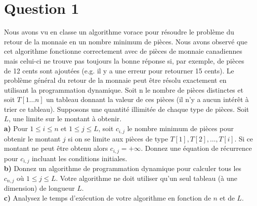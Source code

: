 \documentclass[devoir3.tex]{subfiles}
\begin{document}
\section*{Question 1}
Nous avons vu en classe un algorithme vorace pour résoudre le problème du retour de la monnaie en un nombre minimum de pièces. Nous avons observé que cet algorithme fonctionne correctement avec de pièces de monnaie canadiennes mais celui-ci ne trouve pas toujours la bonne réponse si, par exemple, de pièces de 12 cents sont ajoutées (e.g. il y a une erreur pour retourner 15 cents). Le problème général du retour de la monnaie peut être résolu exactement en utilisant la programmation dynamique.
Soit n le nombre de pièces distinctes et soit \(T[1 \dots n]\) un tableau donnant la valeur de ces pièces (il n’y a aucun intérêt à trier ce tableau). Supposons une quantité illimitée de chaque type de pièces. Soit \(L\), une limite sur le montant à obtenir. \\

\textbf{a)} Pour \(1 \leq i \leq n\) et \(1 \leq j \leq L\), soit \(c_{i,j}\) le nombre minimum
de pièces pour obtenir le montant \(j\) si on se limite aux pièces de type \(T[1], T[2], \dots , T[i]\). Si ce montant ne peut être obtenu alors \(c_{i,j} = +\infty \). Donnez une équation de récurrence pour \(c_{i,j}\) incluant les conditions initiales. \\

\textbf{b)} Donnez un algorithme de programmation dynamique pour calculer tous les \(c_{n,j}\) où \(1 \leq j \leq L\). Votre algorithme ne doit utiliser qu’un seul tableau (à une dimension) de longueur \(L\). \\

\textbf{c)} Analysez le temps d’exécution de votre algorithme en fonction de \(n\)
et de \(L\).
\end{document}
